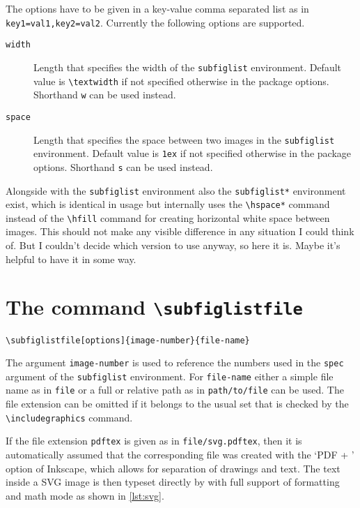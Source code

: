 \documentclass[version=3.12,american]{scrartcl}
\begin{document}
The options have to be given in a key-value comma separated list as in \texttt{key1=val1,key2=val2}. Currently the following options are supported.

\begin{description}
\item[\texttt{width}\enskip] Length that specifies the width of the \texttt{subfiglist} environment. Default value is \verb|\textwidth| if not specified otherwise in the package options. Shorthand \texttt{w} can be used instead.

\item[\texttt{space}\enskip] Length that specifies the space between two images in the \texttt{subfiglist} environment. Default value is \texttt{1ex} if not specified otherwise in the package options. Shorthand \texttt{s} can be used instead.
\end{description}

Alongside with the \texttt{subfiglist} environment also the \texttt{subfiglist*} environment exist, which is identical in usage but internally uses the \verb|\hspace*| command instead of the \verb|\hfill| command for creating horizontal white space between images. This should not make any visible difference in any situation I could think of. But I couldn't decide which version to use anyway, so here it is. Maybe it's helpful to have it in some way.

\section{The command \texttt{\textbackslash subfiglistfile}}
\begin{verbatim}
\subfiglistfile[options]{image-number}{file-name}
\end{verbatim}

The argument \texttt{image-number} is used to reference the numbers used in the \texttt{spec} argument of the \texttt{subfiglist} environment. For \texttt{file-name} either a simple file name as in \texttt{file} or a full or relative path as in \texttt{path/to/file} can be used. The file extension can be omitted if it belongs to the usual set that is checked by the \verb|\includegraphics| command.

If the file extension \texttt{pdf\textunderscore tex} is given as in \texttt{file/svg.pdf\textunderscore tex}, then it is automatically assumed that the corresponding file was created with the `PDF + ' option of Inkscape, which allows for separation of drawings and text. The text inside a SVG image is then typeset directly by  with full support of formatting and math mode as shown in \cref{lst:svg}.
\end{document}
